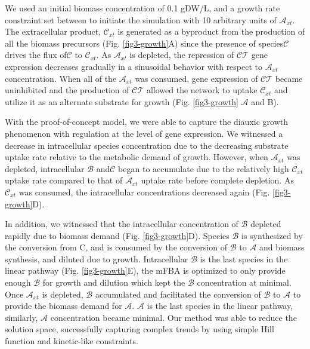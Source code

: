 \documentclass[12pt]{article}
\begin{document}
We used an initial biomass concentration of 0.1 gDW/L, and a growth rate constraint set between  to initiate the simulation with 10 arbitrary units of $\mathcal{A}_{xt}$. The extracellular product, $\mathcal{C}_{xt}$ is generated as a byproduct from the production of all the biomass precursors (Fig. \ref{fig3-growth}A) since the presence of species$\mathcal{C}$ drives the flux of$\mathcal{C}$ to $\mathcal{C}_{xt}$. As $\mathcal{A}_{xt}$ is depleted, the repression of $\mathcal{CT}$ gene expression decreases gradually in a sinusoidal behavior with respect to $\mathcal{A}_{xt}$ concentration. When all of the $\mathcal{A}_{xt}$ was consumed, gene expression of $\mathcal{CT}$ became uninhibited and the production of $\mathcal{CT}$ allowed the network to uptake $\mathcal{C}_{xt}$ and utilize it as an alternate substrate for growth (Fig. \ref{fig3-growth} $\mathcal{A}$ and B).

With the proof-of-concept model, we were able to capture the diauxic growth phenomenon with regulation at the level of gene expression. We witnessed a decrease in intracellular species concentration due to the decreasing substrate uptake rate relative to the metabolic demand of growth. However, when $\mathcal{A}_{xt}$ was depleted, intracellular $\mathcal{B}$ and$\mathcal{C}$ began to accumulate due to the relatively high $\mathcal{C}_{xt}$ uptake rate compared to that of $\mathcal{A}_{xt}$ uptake rate before complete depletion. As $\mathcal{C}_{xt}$ was consumed, the intracellular concentrations decreased again (Fig. \ref{fig3-growth}D). 

In addition, we witnessed that the intracellular concentration of $\mathcal{B}$ depleted rapidly due to biomass demand (Fig. \ref{fig3-growth}D). Species $\mathcal{B}$ is synthesized by the conversion from C, and is consumed by the conversion of $\mathcal{B}$ to $\mathcal{A}$ and biomass synthesis, and diluted due to growth. Intracellular $\mathcal{B}$ is the last species in the linear pathway (Fig. \ref{fig3-growth}E), the mFBA is optimized to only provide enough $\mathcal{B}$ for growth and dilution which kept the $\mathcal{B}$ concentration at minimal. Once $\mathcal{A}_{xt}$ is depleted, $\mathcal{B}$ accumulated and facilitated the conversion of $\mathcal{B}$ to $\mathcal{A}$ to provide the biomass demand for $\mathcal{A}$. $\mathcal{A}$ is the last species in the linear pathway, similarly, $\mathcal{A}$ concentration became minimal. Our method was able to reduce the solution space, successfully capturing complex trends by using simple Hill function and kinetic-like constraints.
\end{document}
